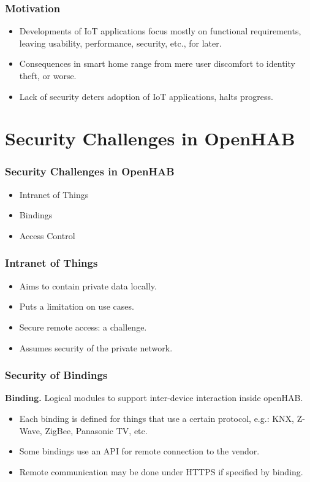 \documentclass{beamer}
\begin{document}
\begin{frame}
\frametitle{Motivation}
\begin{itemize}
  \setlength\itemsep{1.5em}
\item Developments of IoT applications focus mostly on functional requirements, leaving usability, performance, security, etc., for later.
\item Consequences in smart home range from mere user discomfort to identity theft, or worse.
\item Lack of security deters adoption of IoT applications, halts progress. 
\end{itemize}
\end{frame}
\section{Security Challenges in OpenHAB}
\begin{frame}
\frametitle{Security Challenges in OpenHAB}
\begin{itemize}
  \setlength\itemsep{1.5em}
\item Intranet of Things
\item Bindings
\item Access Control
\end{itemize}
\end{frame}
\begin{frame}
\frametitle{Intranet of Things}
\begin{itemize}
  \setlength\itemsep{1.5em}
\item Aims to contain private data locally.
\item Puts a limitation on use cases.
\item Secure remote access: a challenge.
\item Assumes security of the private network.
\end{itemize}
\end{frame}
\begin{frame}
\frametitle{Security of Bindings}
\textbf{Binding.} Logical modules to support inter-device interaction inside openHAB.
\begin{itemize}
  \setlength\itemsep{1.5em}
\item Each binding is defined for things that use a certain protocol, e.g.: KNX, Z-Wave, ZigBee, Panasonic TV, etc.
\item Some bindings use an API for remote connection to the vendor.
\item Remote communication may be done under HTTPS if specified by binding.
\end{itemize}
\end{frame}
\end{document}
